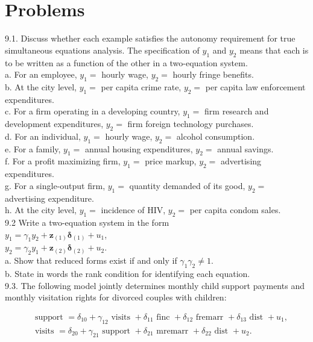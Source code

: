 \documentclass[10pt]{article}
\begin{document}
\section*{Problems}
9.1. Discuss whether each example satisfies the autonomy requirement for true simultaneous equations analysis. The specification of $y_{1}$ and $y_{2}$ means that each is to be written as a function of the other in a two-equation system.\\
a. For an employee, $y_{1}=$ hourly wage, $y_{2}=$ hourly fringe benefits.\\
b. At the city level, $y_{1}=$ per capita crime rate, $y_{2}=$ per capita law enforcement expenditures.\\
c. For a firm operating in a developing country, $y_{1}=$ firm research and development expenditures, $y_{2}=$ firm foreign technology purchases.\\
d. For an individual, $y_{1}=$ hourly wage, $y_{2}=$ alcohol consumption.\\
e. For a family, $y_{1}=$ annual housing expenditures, $y_{2}=$ annual savings.\\
f. For a profit maximizing firm, $y_{1}=$ price markup, $y_{2}=$ advertising expenditures.\\
g. For a single-output firm, $y_{1}=$ quantity demanded of its good, $y_{2}=$ advertising expenditure.\\
h. At the city level, $y_{1}=$ incidence of HIV, $y_{2}=$ per capita condom sales.\\
9.2 Write a two-equation system in the form\\
$y_{1}=\gamma_{1} y_{2}+\mathbf{z}_{(1)} \boldsymbol{\delta}_{(1)}+u_{1}$,\\
$y_{2}=\gamma_{2} y_{1}+\mathbf{z}_{(2)} \boldsymbol{\delta}_{(2)}+u_{2}$.\\
a. Show that reduced forms exist if and only if $\gamma_{1} \gamma_{2} \neq 1$.\\
b. State in words the rank condition for identifying each equation.\\
9.3. The following model jointly determines monthly child support payments and monthly visitation rights for divorced couples with children:

$$
\begin{aligned}
& \text { support }=\delta_{10}+\gamma_{12} \text { visits }+\delta_{11} \text { finc }+\delta_{12} \text { fremarr }+\delta_{13} \text { dist }+u_{1}, \\
& \text { visits }=\delta_{20}+\gamma_{21} \text { support }+\delta_{21} \text { mremarr }+\delta_{22} \text { dist }+u_{2} .
\end{aligned}
$$
\end{document}
